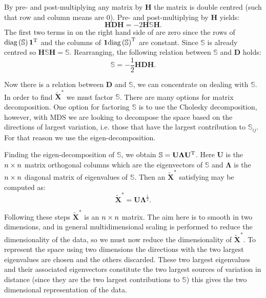By pre- and post-multiplying any matrix by $\mathbf{H}$ the matrix is double centred (such that row and column means are 0). Pre- and post-multiplying  by $\mathbf{H}$ yields:
\begin{equation}
\mathbf{H}\mathbf{D}\mathbf{H} = -2\mathbf{H}\mathbb{S}\mathbf{H}.
\end{equation}
The first two terms in on the right hand side of  are zero since the rows of $\text{diag}\left(\mathbb{S}\right)\bm{1}^{\text{T}}$ and the columns of  $\bm{1}\text{diag}\left(\mathbb{S}\right)^{\text{T}}$ are constant. Since $\mathbb{S}$ is already centred so $\mathbf{H}\mathbb{S}\mathbf{H}=\mathbb{S}$. Rearranging, the following relation between $\mathbb{S}$ and $\mathbf{D}$ holds:
\begin{equation}
\mathbb{S} = -\frac{1}{2}\mathbf{H}\mathbf{D}\mathbf{H}.
\end{equation}

Now there is a relation between $\mathbf{D}$ and $\mathbb{S}$, we can concentrate on dealing with $\mathbb{S}$. In order to find $\tilde{\mathbf{X}}^{*}$ we must factor $\mathbb{S}$. There are many options for matrix decomposition. One option for factoring $\mathbb{S}$ is to use the Cholesky decomposition, however, with MDS we are looking to decompose the space based on the directions of largest variation, i.e. those that have the largest contribution to $\mathbb{S}_{ij}$. For that reason we use the eigen-decomposition.

Finding the eigen-decomposition of $\mathbb{S}$, we obtain $\mathbb{S}=\mathbf{U}\mathbf{\Lambda}\mathbf{U}^{\text{T}}$. Here $\mathbf{U}$ is the $n \times n$ matrix orthogonal columns which are the eigenvectors of $\mathbb{S}$ and $\mathbf{\Lambda}$ is the $n \times n$ diagonal matrix of eigenvalues of $\mathbb{S}$. Then an $\tilde{\mathbf{X}}^*$ satisfying  may be computed as:
\begin{equation}
\tilde{\mathbf{X}}^*=\mathbf{U}\mathbf{\Lambda}^{\frac{1}{2}}.
\end{equation}

Following these steps $\tilde{\mathbf{X}}^*$ is an $n \times n$ matrix. The aim here is to smooth in two dimensions, and in general multidimensional scaling is performed to reduce the dimensionality of the data, so we must now reduce the dimensionality of $\tilde{\mathbf{X}}^*$. To represent the space using two dimensions the directions with the two largest eigenvalues are chosen and the others discarded. These two largest eigenvalues and their associated eigenvectors constitute the two largest sources of variation in distance (since they are the two largest contributions to $\mathbb{S}$) this gives the two dimensional representation of the data. 

